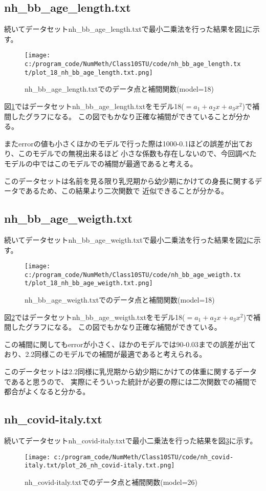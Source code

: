 \documentclass[a4paper,11pt,dvipdfmx]{jsarticle}
\begin{document}
\newpage
\subsection{nh\_bb\_age\_length.txt}
続いてデータセットnh\_bb\_age\_length.txtで最小二乗法を行った結果を図\ref{len}に示す。
\begin{figure}[h]
\centering
\texttt{[image: c:/program\_code/NumMeth/Class10STU/code/nh\_bb\_age\_length.txt/plot\_18\_nh\_bb\_age\_length.txt.png]}
\caption{nh\_bb\_age\_length.txtでのデータ点と補間関数(model=18)}
\label{len}
\end{figure}

図\ref{len}ではデータセットnh\_bb\_age\_length.txtをモデル18($=a_1+a_2x+a_3x^2$)で補間したグラフになる。
この図でもかなり正確な補間ができていることが分かる。

またerrorの値も小さくほかのモデルで行った際は1000-0.1ほどの誤差が出ており、このモデルでの無視出来るほど
小さな係数も存在しないので、今回調べたモデルの中ではこのモデルでの補間が最適であると考える。

このデータセットは名前を見る限り乳児期から幼少期にかけての身長に関するデータであるため、この結果より二次関数で
近似できることが分かる。

\subsection{nh\_bb\_age\_weigth.txt}
続いてデータセットnh\_bb\_age\_weigth.txtで最小二乗法を行った結果を図\ref{wgh}に示す。
\begin{figure}[h]
\centering
\texttt{[image: c:/program\_code/NumMeth/Class10STU/code/nh\_bb\_age\_weigth.txt/plot\_18\_nh\_bb\_age\_weigth.txt.png]}
\caption{nh\_bb\_age\_weigth.txtでのデータ点と補間関数(model=18)}
\label{wgh}
\end{figure}

図\ref{wgh}ではデータセットnh\_bb\_age\_weigth.txtをモデル18($=a_1+a_2x+a_3x^2$)で補間したグラフになる。
この図でもかなり正確な補間ができている。

この補間に関してもerrorが小さく、ほかのモデルでは90-0.03までの誤差が出ており、2.2同様このモデルでの補間が最適であると考えられる。

このデータセットは2.2同様に乳児期から幼少期にかけての体重に関するデータであると思うので、
実際にそういった統計が必要の際には二次関数での補間で都合がよくなると分かる。

\subsection{nh\_covid-italy.txt}
続いてデータセットnh\_covid-italy.txtで最小二乗法を行った結果を図\ref{cov}に示す。
\begin{figure}[h]
\centering
\texttt{[image: c:/program\_code/NumMeth/Class10STU/code/nh\_covid-italy.txt/plot\_26\_nh\_covid-italy.txt.png]}
\caption{nh\_covid-italy.txtでのデータ点と補間関数(model=26)}
\label{cov}
\end{figure}
\end{document}
